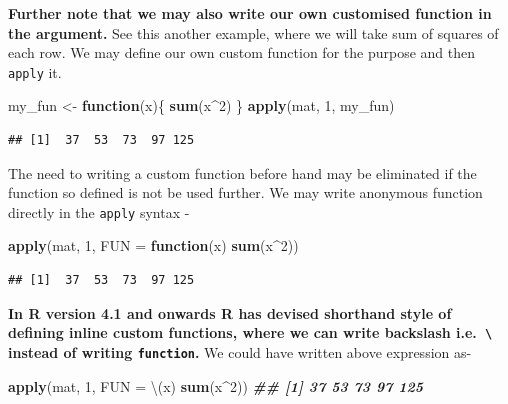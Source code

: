 \documentclass[
]{book}
\newenvironment{Shaded}{\begin{snugshade}}{\end{snugshade}}
\newcommand{\AttributeTok}[1]{\textcolor[rgb]{0.13,0.29,0.53}{#1}}
\newcommand{\ControlFlowTok}[1]{\textcolor[rgb]{0.13,0.29,0.53}{\textbf{#1}}}
\newcommand{\DecValTok}[1]{\textcolor[rgb]{0.00,0.00,0.81}{#1}}
\newcommand{\DocumentationTok}[1]{\textcolor[rgb]{0.56,0.35,0.01}{\textbf{\textit{#1}}}}
\newcommand{\FunctionTok}[1]{\textcolor[rgb]{0.13,0.29,0.53}{\textbf{#1}}}
\newcommand{\NormalTok}[1]{#1}
\newcommand{\OtherTok}[1]{\textcolor[rgb]{0.56,0.35,0.01}{#1}}
\newcommand{\SpecialCharTok}[1]{\textcolor[rgb]{0.81,0.36,0.00}{\textbf{#1}}}
\begin{document}
\textbf{Further note that we may also write our own customised function in the argument.} See this another example, where we will take sum of squares of each row. We may define our own custom function for the purpose and then \texttt{apply} it.

\begin{Shaded}
\begin{Highlighting}[]
\NormalTok{my\_fun }\OtherTok{\textless{}{-}} \ControlFlowTok{function}\NormalTok{(x)\{}
  \FunctionTok{sum}\NormalTok{(x}\SpecialCharTok{\^{}}\DecValTok{2}\NormalTok{)}
\NormalTok{\}}
\FunctionTok{apply}\NormalTok{(mat, }\DecValTok{1}\NormalTok{, my\_fun)}
\end{Highlighting}
\end{Shaded}

\begin{verbatim}
## [1]  37  53  73  97 125
\end{verbatim}

The need to writing a custom function before hand may be eliminated if the function so defined is not be used further. We may write anonymous function directly in the \texttt{apply} syntax -

\begin{Shaded}
\begin{Highlighting}[]
\FunctionTok{apply}\NormalTok{(mat, }\DecValTok{1}\NormalTok{, }\AttributeTok{FUN =} \ControlFlowTok{function}\NormalTok{(x) }\FunctionTok{sum}\NormalTok{(x}\SpecialCharTok{\^{}}\DecValTok{2}\NormalTok{))}
\end{Highlighting}
\end{Shaded}

\begin{verbatim}
## [1]  37  53  73  97 125
\end{verbatim}

\textbf{In R version 4.1 and onwards R has devised shorthand style of defining inline custom functions, where we can write backslash i.e.~\texttt{\textbackslash{}} instead of writing \texttt{function}.} We could have written above expression as-

\begin{Shaded}
\begin{Highlighting}[]
\FunctionTok{apply}\NormalTok{(mat, }\DecValTok{1}\NormalTok{, }\AttributeTok{FUN =}\NormalTok{ \textbackslash{}(x) }\FunctionTok{sum}\NormalTok{(x}\SpecialCharTok{\^{}}\DecValTok{2}\NormalTok{))}
\DocumentationTok{\#\# [1]  37  53  73  97 125}
\end{Highlighting}
\end{Shaded}
\end{document}
